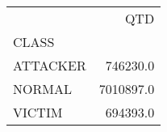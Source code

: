 \begin{tabular}{lr}
\toprule
{} &        QTD \\
CLASS    &            \\
\midrule
ATTACKER &   746230.0 \\
NORMAL   &  7010897.0 \\
VICTIM   &   694393.0 \\
\bottomrule
\end{tabular}
